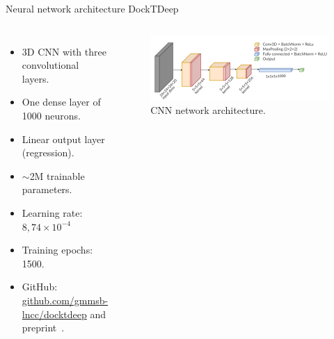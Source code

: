 \documentclass[aspectratio=169,xcolor=dvipsnames]{beamer}
\begin{document}
\begin{frame}{Neural network architecture \hfill {\footnotesize \alert{DockTDeep}}}
    \begin{columns}[c]
        \begin{itemize}
            \item 3D CNN with three convolutional layers.
            \item One dense layer of 1000 neurons.
            \item Linear output layer (regression).
            \item $\sim$2M trainable parameters.
            \item Learning rate: $8,74\times10^{-4}$
            \item Training epochs: 1500.
            \item GitHub: {\color{blue} \href{https://github.com/gmmsb-lncc/docktdeep}{github.com/gmmsb-lncc/docktdeep}} and preprint~\cite{da2025data}.
        \end{itemize}

        \begin{figure}
            \centering
            \includegraphics[width=1.\linewidth]{imgs/arquitetura-cnn.png}
            \caption{CNN network architecture.}
        \end{figure}
    \end{columns}
\end{frame}
\end{document}
